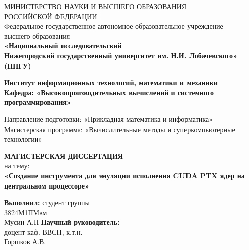 \begin{titlepage}

    \begin{center}
        {МИНИСТЕРСТВО НАУКИ И ВЫСШЕГО ОБРАЗОВАНИЯ \\
        РОССИЙСКОЙ ФЕДЕРАЦИИ}
        \\
        Федеральное государственное автономное образовательное учреждение \\
        высшего образования
        \\
        {\bfseries «Национальный исследовательский \\ Нижегородский государственный университет им. Н.И. Лобачевского»\\(ННГУ)}
    
        \vspace{1em}
  
        {\bfseries Институт информационных технологий, математики и механики \\
        \vspace{0.8em}
        Кафедра: «Высокопроизводительных вычислений и системного программирования»} \\
        
        \vspace{2em}

        Направление подготовки: «Прикладная математика и информатика» \\
        Магистерская программа: «Вычислительные методы и суперкомпьютерные \\ технологии»
    
    \end{center}


    \begin{center}
    \end{center}

    \vspace{3em}

    \begin{center}
        {\bfseries МАГИСТЕРСКАЯ ДИССЕРТАЦИЯ} \\
        \vspace{0.8em}
        на тему: \\
        {\bfseries «Создание инструмента для эмуляции исполнения CUDA PTX ядер на центральном процессоре»}
    \end{center}

    \vspace{4.5em}


    \begin{flushright}
        {\bfseries Выполнил:} студент группы\\3824М1ПМвм\\Мусин А.Н \underline{\hspace{3cm}} \linebreak\linebreak\linebreak
        {\bfseries Научный руководитель:}\\ доцент каф. ВВСП, к.т.н.\\ Горшков А.В.\underline{\hspace{3cm}} 
    \end{flushright}



\end{titlepage}
